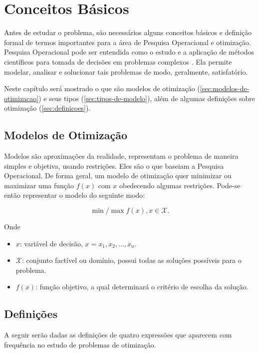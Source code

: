\chapter{Conceitos Básicos}\label{ch:conceitos-basicos}

Antes de estudar o problema, são necessários alguns conceitos básicos e definição formal de termos importantes para a área de Pesquisa Operacional e otimização.
Pesquisa Operacional pode ser entendida como o estudo e a aplicação de métodos científicos para tomada de decisões em problemas complexos \cite[p.IX]{arenales}.
Ela permite modelar, analisar e solucionar tais problemas de modo, geralmente, satisfatório.

Neste capítulo será mostrado o que são modelos de otimização (\autoref{sec:modelos-de-otimizacao}) e seus tipos (\autoref{sec:tipos-de-modelo}), além de algumas definições sobre otimização (\autoref{sec:definicoes}).


\section{Modelos de Otimização}\label{sec:modelos-de-otimizacao}

Modelos são aproximações da realidade, representam o problema de maneira simples e objetiva, usando restrições.
Eles são o que baseiam a Pesquisa Operacional.
De forma geral, um modelo de otimização quer minimizar ou maximizar uma função $f(x)$ com $x$ obedecendo algumas restrições.
Pode-se então representar o modelo do seguinte modo:

\[
    \min\!/\!\max f(x), x \in \mathcal{X}.
\]

Onde

\begin{itemize}
    \item $x$: variável de decisão, $x = x_1, x_2, \dots, x_n$.
    \item $\mathcal{X}$: conjunto factível ou domínio, possui todas as soluções possíveis para o problema.
    \item $f(x)$: função objetivo, a qual determinará o critério de escolha da solução.
\end{itemize}


\section{Definições}\label{sec:definicoes}

A seguir serão dadas as definições de quatro expressões que aparecem com frequência no estudo de problemas de otimização.


